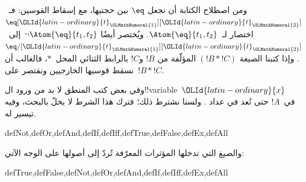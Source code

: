 \documentclass[../../../include/open-logic-section]{subfiles}
\begin{document}
ومن اصطلاح الكتابة أن نجعل $\eq$ بين حجتيها، مع إسقاط القوسين:
فـ~$\eq[\OLId{latin-ordinary}{t}_\OLMathNumeral{1}][\OLId{latin-ordinary}{t}_\OLMathNumeral{2}]$ اختصار لـ~$\Atom{\eq}{t_1,t_2}$. ويُختصر أيضًا
$\lnot \Atom{\eq}{t_1,t_2}$ إلى~$\eq/[\OLId{latin-ordinary}{t}_\OLMathNumeral{1}][\OLId{latin-ordinary}{t}_\OLMathNumeral{2}]$. وإذا كتبنا الصيغة
$(!B \ast !C)$ المؤلّفة من $!B$ و$!C$ بالرابط الثنائي
المحل~$\ast$، فالغالب أن نسقط قوسيها الخارجيين ونقتصر
على~$!B \ast !C$.

\begin{intro}
وفي بعض كتب المنطق لا بد من ورود ال!!{variable}~$\OLId{latin-ordinary}{x}$ في~$!A$ حتى تُعد
%
%
%
في عداد
.
ولسنا نشترط ذلك؛ فترك هذا الشرط لا يخلّ بالبحث، وفيه تيسير له.
\end{intro}

\begin{tagblock}{defNot,defOr,defAnd,defIf,defIff,defTrue,defFalse,defEx,defAll}
\begin{defn}
والصيغ التي تدخلها المؤثرات المعرّفة تُردّ إلى أصولها على الوجه الآتي:

\begin{tagenumerate}{defTrue,defFalse,defNot,defOr,defAnd,defIf,defIff,defEx,defAll}









\end{tagenumerate}
\end{defn}
\end{tagblock}
\end{document}
